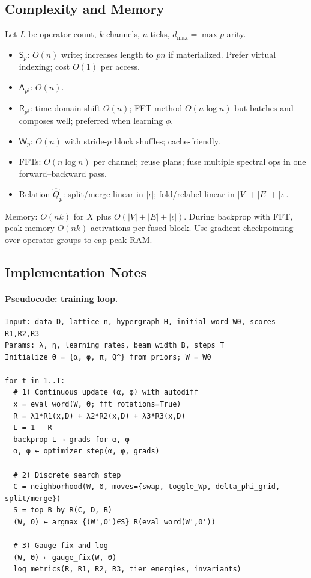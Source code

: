\documentclass[12pt]{article}
\numberwithin{equation}{section}
\theoremstyle{plain}
\theoremstyle{definition}
\theoremstyle{remark}
\begin{document}
\subsection*{Complexity and Memory}
Let \(L\) be operator count, \(k\) channels, \(n\) ticks, \(d_{\max}=\max p\) arity.
\begin{itemize}
  \item \(\mathsf{S}_p\): \(O(n)\) write; increases length to \(pn\) if materialized. Prefer virtual indexing; cost \(O(1)\) per access.
  \item \(\mathsf{A}_{p^j}\): \(O(n)\).
  \item \(\mathsf{R}_{p^j}\): time-domain shift \(O(n)\); FFT method \(O(n\log n)\) but batches and composes well; preferred when learning \(\phi\).
  \item \(\mathsf{W}_p\): \(O(n)\) with stride-\(p\) block shuffles; cache-friendly.
  \item FFTs: \(O(n\log n)\) per channel; reuse plans; fuse multiple spectral ops in one forward–backward pass.
  \item Relation \(\hat{Q}_p\): split/merge linear in \(|\iota|\); fold/relabel linear in \(|V|+|E|+|\iota|\).
\end{itemize}
Memory: \(O(nk)\) for \(X\) plus \(O(|V|+|E|+|\iota|)\). During backprop with FFT, peak memory \(O(nk)\) activations per fused block. Use gradient checkpointing over operator groups to cap peak RAM.

\subsection*{Implementation Notes}
\paragraph{Pseudocode: training loop.}
\begin{verbatim}
Input: data D, lattice n, hypergraph H, initial word W0, scores R1,R2,R3
Params: λ, η, learning rates, beam width B, steps T
Initialize Θ = {α, φ, π, Q^} from priors; W = W0

for t in 1..T:
  # 1) Continuous update (α, φ) with autodiff
  x = eval_word(W, Θ; fft_rotations=True)
  R = λ1*R1(x,D) + λ2*R2(x,D) + λ3*R3(x,D)
  L = 1 - R
  backprop L → grads for α, φ
  α, φ ← optimizer_step(α, φ, grads)

  # 2) Discrete search step
  C = neighborhood(W, Θ, moves={swap, toggle_Wp, delta_phi_grid, split/merge})
  S = top_B_by_R(C, D, B)
  (W, Θ) ← argmax_{(W',Θ')∈S} R(eval_word(W',Θ'))

  # 3) Gauge-fix and log
  (W, Θ) ← gauge_fix(W, Θ)
  log_metrics(R, R1, R2, R3, tier_energies, invariants)
\end{verbatim}
\end{document}
